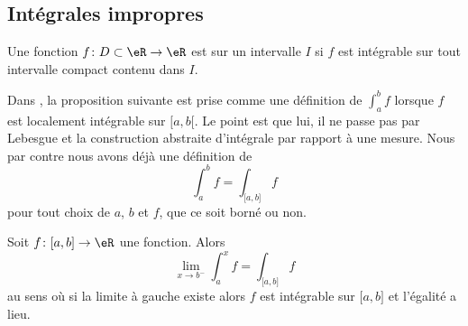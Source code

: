 \subsection{Intégrales impropres}

\begin{definition}
    Une fonction \( f\colon D\subset\eR\to \eR\) est  sur un intervalle \( I\) si \( f\) est intégrable sur tout intervalle compact contenu dans \( I\).
\end{definition}

Dans \cite{TrenchRealAnalisys}, la proposition suivante est prise comme une définition de \( \int_a^bf\) lorsque \( f\) est localement intégrable sur \( \mathopen[ a , b [\). Le point est que lui, il ne passe pas par Lebesgue et la construction abstraite d'intégrale par rapport à une mesure. Nous par contre nous avons déjà une définition de
\begin{equation}
    \int_a^bf=\int_{\mathopen[ a , b \mathclose]}f
\end{equation}
pour tout choix de \( a\), \( b\) et \( f\), que ce soit borné ou non.

\begin{proposition}     \label{PropCJAooQhNYkp}
    Soit \( f\colon \mathopen[ a , b \mathclose]\to \eR\) une fonction. Alors
    \begin{equation}    \label{EqPPMooBQDTYl}
        \lim_{x\to b^-} \int_a^xf=\int_{\mathopen[ a , b \mathclose]}f
    \end{equation}
    au sens où si la limite à gauche existe alors \( f\) est intégrable sur \( \mathopen[ a , b \mathclose]\) et l'égalité a lieu.
\end{proposition}

